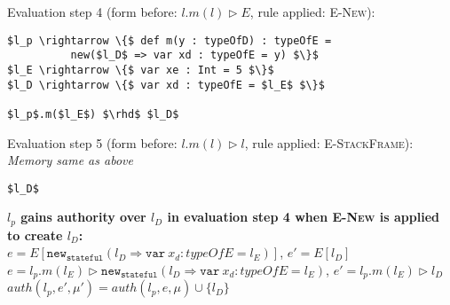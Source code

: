 \documentclass{llncs}
\newcommand{\keywadj}[1]{\mathtt{#1}}
\newcommand{\keyw}[1]{\keywadj{#1}~}
\begin{document}
\vspace{12pt}
\noindent Evaluation step 4 (form before: $l.m(l) \rhd E$, rule applied: \textsc{E-New}):
\vspace{-6pt}
\begin{lstlisting}[xleftmargin=20pt]
$l_p \rightarrow \{$ def m(y : typeOfD) : typeOfE =
          new($l_D$ => var xd : typeOfE = y) $\}$
$l_E \rightarrow \{$ var xe : Int = 5 $\}$
$l_D \rightarrow \{$ var xd : typeOfE = $l_E$ $\}$

$l_p$.m($l_E$) $\rhd$ $l_D$
\end{lstlisting}

\vspace{12pt}
\noindent Evaluation step 5 (form before: $l.m(l) \rhd l$, rule applied: \textsc{E-StackFrame}):\\
\vspace{-6pt}
\indent\textit{Memory same as above}\\
\vspace{-6pt}
\begin{lstlisting}[xleftmargin=20pt]
$l_D$
\end{lstlisting}

\newpage

\noindent\textbf{$l_p$ gains authority over $l_D$ in evaluation step 4 when \textsc{E-New} is applied to create $l_D$:}\\

\noindent$e = E[\keywadj{new}_{\keywadj{stateful}}(l_D \Rightarrow \keyw{var} x_d : typeOfE = l_E)]$, $e' = E[l_D]$\\

\noindent$e = l_p.m(l_E) \rhd \keywadj{new}_{\keywadj{stateful}}(l_D \Rightarrow \keyw{var} x_d : typeOfE = l_E)$, $e' = l_p.m(l_E) \rhd l_D$\\

\noindent$auth(l_p, e', \mu') = auth(l_p, e, \mu) \cup \{ l_D \}$
\end{document}
